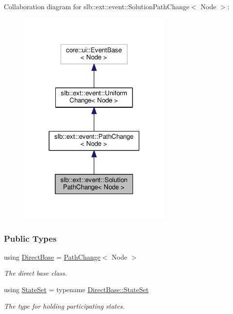Collaboration diagram for slb\+:\+:ext\+:\+:event\+:\+:Solution\+Path\+Change$<$ Node $>$\+:\nopagebreak
\begin{figure}[H]
\begin{center}
\leavevmode
\includegraphics[width=219pt]{structslb_1_1ext_1_1event_1_1SolutionPathChange__coll__graph}
\end{center}
\end{figure}
\subsubsection*{Public Types}
\begin{DoxyCompactItemize}
\item 
using \hyperlink{structslb_1_1ext_1_1event_1_1SolutionPathChange_a92dae17928b41c4ad1c8ba9e01a6e52c}{Direct\+Base} = \hyperlink{structslb_1_1ext_1_1event_1_1PathChange}{Path\+Change}$<$ Node $>$\hypertarget{structslb_1_1ext_1_1event_1_1SolutionPathChange_a92dae17928b41c4ad1c8ba9e01a6e52c}{}\label{structslb_1_1ext_1_1event_1_1SolutionPathChange_a92dae17928b41c4ad1c8ba9e01a6e52c}

\begin{DoxyCompactList}\small\item\em The direct base class. \end{DoxyCompactList}\item 
using \hyperlink{structslb_1_1ext_1_1event_1_1SolutionPathChange_abc85d367d6fbe81efa7e8d3f7c11c31f}{State\+Set} = typename \hyperlink{structslb_1_1ext_1_1event_1_1UniformChange_a2c45514041ea86f77bbd0147fe06babd}{Direct\+Base\+::\+State\+Set}\hypertarget{structslb_1_1ext_1_1event_1_1SolutionPathChange_abc85d367d6fbe81efa7e8d3f7c11c31f}{}\label{structslb_1_1ext_1_1event_1_1SolutionPathChange_abc85d367d6fbe81efa7e8d3f7c11c31f}

\begin{DoxyCompactList}\small\item\em The type for holding participating states. \end{DoxyCompactList}\end{DoxyCompactItemize}
